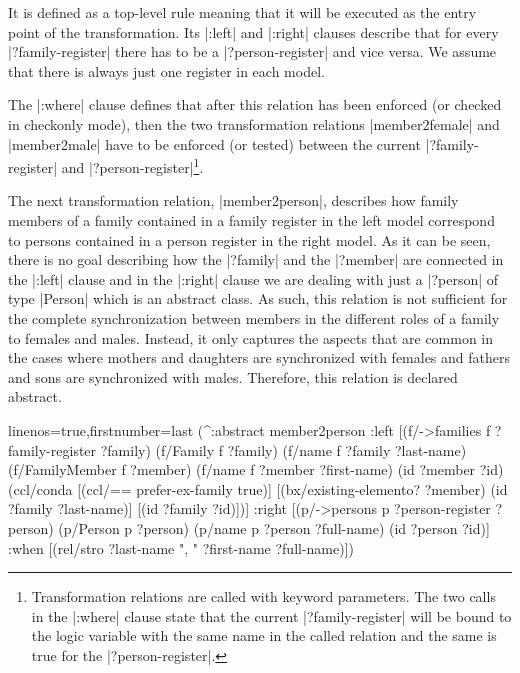 \documentclass[a4paper]{article}
\newcommand{\code}{\clojureinline}
\begin{document}
It is defined as a top-level rule meaning that it will be executed as the entry
point of the transformation.  Its \code|:left| and \code|:right| clauses
describe that for every \code|?family-register| there has to be a
\code|?person-register| and vice versa.  We assume that there is always just
one register in each model.

The \code|:where| clause defines that after this relation has been enforced (or
checked in checkonly mode), then the two transformation relations
\code|member2female| and \code|member2male| have to be enforced (or tested)
between the current \code|?family-register| and
\code|?person-register|\footnote{Transformation relations are called with
  keyword parameters.  The two calls in the \code|:where| clause state that the
  current \code|?family-register| will be bound to the logic variable with the
  same name in the called relation and the same is true for the
  \code|?person-register|.}.

The next transformation relation, \code|member2person|, describes how family
members of a family contained in a family register in the left model correspond
to persons contained in a person register in the right model.  As it can be
seen, there is no goal describing how the \code|?family| and the \code|?member|
are connected in the \code|:left| clause and in the \code|:right| clause we are
dealing with just a \code|?person| of type \code|Person| which is an abstract
class.  As such, this relation is not sufficient for the complete
synchronization between members in the different roles of a family to females
and males.  Instead, it only captures the aspects that are common in the cases
where mothers and daughters are synchronized with females and fathers and sons
are synchronized with males.  Therefore, this relation is declared abstract.

\begin{clojurecode*}{linenos=true,firstnumber=last}
  (^:abstract member2person
   :left  [(f/->families f ?family-register ?family)
           (f/Family f ?family)
           (f/name f ?family ?last-name)
           (f/FamilyMember f ?member)
           (f/name f ?member ?first-name)
           (id ?member ?id)
           (ccl/conda
            [(ccl/== prefer-ex-family true)]
            [(bx/existing-elemento? ?member)
             (id ?family ?last-name)]
            [(id ?family ?id)])]
   :right [(p/->persons p ?person-register ?person)
           (p/Person p ?person)
           (p/name p ?person ?full-name)
           (id ?person ?id)]
   :when  [(rel/stro ?last-name ", " ?first-name ?full-name)])
\end{clojurecode*}
\end{document}
